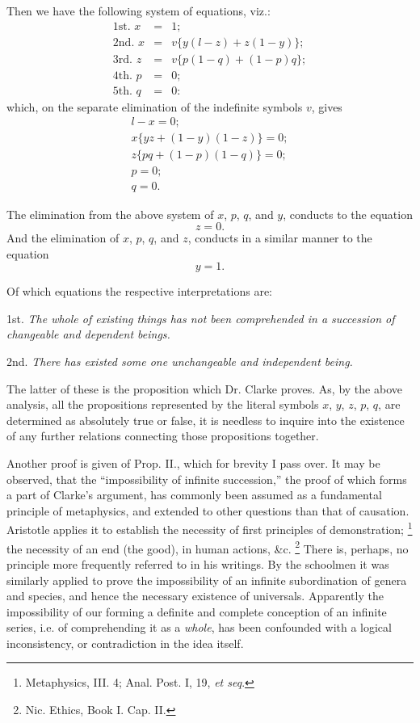 \documentclass[oneside]{book}
\begin{document}
Then we have the following system of equations, viz.:
\begin{eqnarray*}
\textrm{1st. } x &=& 1 ; \\
\textrm{2nd. } x &=& v \{y(l - z) + z(1 - y)\} ; \\
\textrm{3rd. } z &=& v \{p(1 - q) + (1 - p)q\} ; \\
\textrm{4th. } p &=& 0; \\
\textrm{5th. } q &=& 0 :
\end{eqnarray*}
which, on the separate elimination of the indefinite symbols $v$,
gives
\setcounter{equation}{0}
\begin{eqnarray}
l-x = 0; \\ %
x\{yz+(1-y)(1-z)\}=0; \\ %
z\{pq+(1-p)(1-q)\}=0; \\ %
p = 0; \\ %
q = 0.  %
\end{eqnarray}

The elimination from the above system of $x$, $p$, $q$, and $y$,
conducts to the equation
\[z=0.\]
And the elimination of $x$, $p$, $q$, and $z$, conducts in a similar
manner to the equation
\[y=1.\]

Of which equations the respective interpretations are:

1st. \textit{The whole of existing things has not been comprehended
in a succession of changeable and dependent beings.}

2nd. \textit{There has existed some one unchangeable and independent
being.}

The latter of these is the proposition which Dr. Clarke proves.
As, by the above analysis, all the propositions represented by the
literal symbols $x$, $y$, $z$, $p$, $q$, are determined as absolutely true or
false, it is needless to inquire into the existence of any further relations
connecting those propositions together.

Another proof is given of Prop. II., which for brevity I pass
over. It may be observed, that the ``impossibility of infinite
succession,'' the proof of which forms a part of Clarke's argument,
has commonly been assumed as a fundamental principle of
metaphysics, and extended to other questions than that of causation.
Aristotle applies it to establish the necessity of first principles
of demonstration; \footnote{Metaphysics, III. 4; Anal. Post. I, 19, \textit{et seq}.}
the necessity of an end (the good), in
human actions, \&c. \footnote{Nic. Ethics, Book I. Cap. II.} There is, perhaps, no
principle more frequently
referred to in his writings. By the schoolmen it was
similarly applied to prove the impossibility of an infinite subordination
of genera and species, and hence the necessary existence
of universals. Apparently the impossibility of our forming a
definite and complete conception of an infinite series, i.e. of
comprehending it as a \textit{whole}, has been confounded with a logical
inconsistency, or contradiction in the idea itself.
\end{document}

